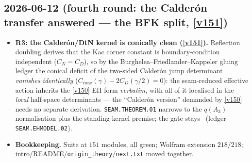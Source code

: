 \subsection*{2026-06-12 (fourth round: the Calder\'on transfer answered --- the BFK split, \vref{v151})}
\begin{itemize}
\item \textbf{R3: the Calder\'on/DtN kernel is conically clean (\vref{v151}).} Reflection
  doubling derives that the Kac corner constant is boundary-condition independent
  ($C_N=C_D$), so by the Burghelea--Friedlander--Kappeler gluing ledger the conical
  deficit of the two-sided Calder\'on jump determinant \emph{vanishes identically}
  ($C_{\mathrm{cone}}(\gamma)-2C_D(\gamma/2)=0$): the seam-reduced effective action
  inherits the \vref{v150} EH form \emph{verbatim}, with all of it localised in the
  \emph{local} half-space determinants --- the ``Calder\'on version'' demanded by
  \vref{v150} needs no separate derivation. \texttt{SEAM.THEOREM.01} narrows to the
  $q(A_3)$ normalisation plus the standing kernel premise; the gate stays \mO\ (ledger
  \texttt{SEAM.EHMODEL.02}).
\item \textbf{Bookkeeping.} Suite at $151$ modules, all green; Wolfram extension
  $218/218$; intro/README/\texttt{origin\_theory}/\texttt{next.txt} moved together.
\end{itemize}

